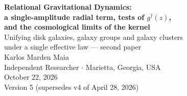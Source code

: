 \documentclass[11pt,a4paper]{article}
\newcommand{\gdag}{g^{\dagger}}
\begin{document}
\begin{center}
{\LARGE\bfseries Relational Gravitational Dynamics:\\[0.3em] a single-amplitude radial term, tests of $\gdag(z)$,\\[0.3em] and the cosmological limits of the kernel}\\[1.2em]
{\large Unifying disk galaxies, galaxy groups and galaxy clusters\\ under a single effective law --- second paper}\\[1.5em]
{\large Karlos Marden Maia}\\
Independent Researcher $\cdot$ Marietta, Georgia, USA\\[0.8em]
October 22, 2026\\[0.4em]
{\small Version 5 (supersedes v4 of April 28, 2026)}
\end{center}
\vspace{0.8em}
\end{document}
